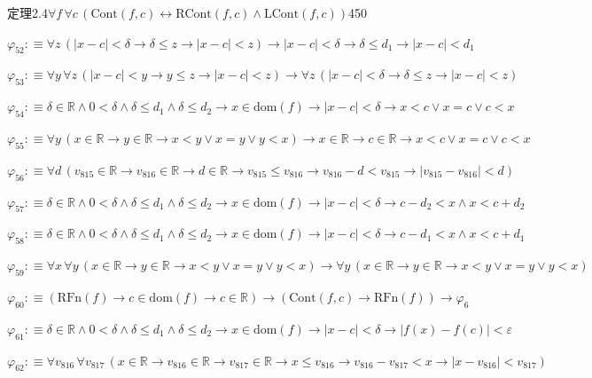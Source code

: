 \begin{fullproof}{定理2.4}{$\forall f\,\forall c\,(\mathrm{Cont}(f,c) \leftrightarrow \mathrm{RCont}(f,c) \land \mathrm{LCont}(f,c))$}{450}
\begin{abbrevlist}
\item $\varphi_{52} :\equiv \forall z\,(\lvert x - c \rvert < \delta \to \delta \leq z \to \lvert x - c \rvert < z) \to \lvert x - c \rvert < \delta \to \delta \leq d_{1} \to \lvert x - c \rvert < d_{1}$
\item $\varphi_{53} :\equiv \forall y\,\forall z\,(\lvert x - c \rvert < y \to y \leq z \to \lvert x - c \rvert < z) \to \forall z\,(\lvert x - c \rvert < \delta \to \delta \leq z \to \lvert x - c \rvert < z)$
\item $\varphi_{54} :\equiv \delta \in \mathbb{R} \land 0 < \delta \land \delta \leq d_{1} \land \delta \leq d_{2} \to x \in \mathrm{dom}(f) \to \lvert x - c \rvert < \delta \to x < c \lor x = c \lor c < x$
\item $\varphi_{55} :\equiv \forall y\,(x \in \mathbb{R} \to y \in \mathbb{R} \to x < y \lor x = y \lor y < x) \to x \in \mathbb{R} \to c \in \mathbb{R} \to x < c \lor x = c \lor c < x$
\item $\varphi_{56} :\equiv \forall d\,(v_{815} \in \mathbb{R} \to v_{816} \in \mathbb{R} \to d \in \mathbb{R} \to v_{815} \leq v_{816} \to v_{816} - d < v_{815} \to \lvert v_{815} - v_{816} \rvert < d)$
\item $\varphi_{57} :\equiv \delta \in \mathbb{R} \land 0 < \delta \land \delta \leq d_{1} \land \delta \leq d_{2} \to x \in \mathrm{dom}(f) \to \lvert x - c \rvert < \delta \to c - d_{2} < x \land x < c + d_{2}$
\item $\varphi_{58} :\equiv \delta \in \mathbb{R} \land 0 < \delta \land \delta \leq d_{1} \land \delta \leq d_{2} \to x \in \mathrm{dom}(f) \to \lvert x - c \rvert < \delta \to c - d_{1} < x \land x < c + d_{1}$
\item $\varphi_{59} :\equiv \forall x\,\forall y\,(x \in \mathbb{R} \to y \in \mathbb{R} \to x < y \lor x = y \lor y < x) \to \forall y\,(x \in \mathbb{R} \to y \in \mathbb{R} \to x < y \lor x = y \lor y < x)$
\item $\varphi_{60} :\equiv (\mathrm{RFn}(f) \to c \in \mathrm{dom}(f) \to c \in \mathbb{R}) \to (\mathrm{Cont}(f,c) \to \mathrm{RFn}(f)) \to \varphi_{6}$
\item $\varphi_{61} :\equiv \delta \in \mathbb{R} \land 0 < \delta \land \delta \leq d_{1} \land \delta \leq d_{2} \to x \in \mathrm{dom}(f) \to \lvert x - c \rvert < \delta \to \lvert f(x) - f(c) \rvert < \varepsilon$
\item $\varphi_{62} :\equiv \forall v_{816}\,\forall v_{817}\,(x \in \mathbb{R} \to v_{816} \in \mathbb{R} \to v_{817} \in \mathbb{R} \to x \leq v_{816} \to v_{816} - v_{817} < x \to \lvert x - v_{816} \rvert < v_{817})$

\end{abbrevlist}
\end{fullproof}
